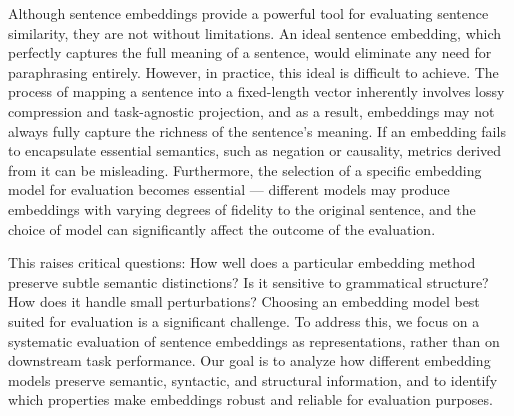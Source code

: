 Although sentence embeddings provide a powerful tool for evaluating sentence similarity, they are not without limitations. An ideal sentence embedding, which perfectly captures the full meaning of a sentence, would eliminate any need for paraphrasing entirely. However, in practice, this ideal is difficult to achieve. The process of mapping a sentence into a fixed-length vector inherently involves lossy compression and task-agnostic projection, and as a result, embeddings may not always fully capture the richness of the sentence's meaning. If an embedding fails to encapsulate essential semantics, such as negation or causality, metrics derived from it can be misleading. Furthermore, the selection of a specific embedding model for evaluation becomes essential --- different models may produce embeddings with varying degrees of fidelity to the original sentence, and the choice of model can significantly affect the outcome of the evaluation.


This raises critical questions: How well does a particular embedding method preserve subtle semantic distinctions? Is it sensitive to grammatical structure? How does it handle small perturbations? Choosing an embedding model best suited for evaluation is a significant challenge. To address this, we focus on a systematic evaluation of sentence embeddings as representations, rather than on downstream task performance. Our goal is to analyze how different embedding models preserve semantic, syntactic, and structural information, and to identify which properties make embeddings robust and reliable for evaluation purposes.

